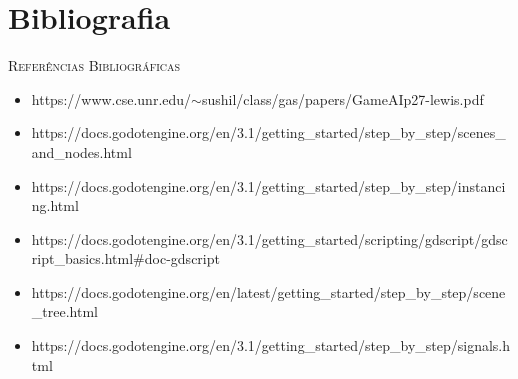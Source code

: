 
\chapter{Bibliografia}
\label{cap:Bibliografia}

\textsc{Referências Bibliográficas} 

\begin{itemize}
    \item[]
        https://www.cse.unr.edu/$\sim$sushil/class/gas/papers/GameAIp27-lewis.pdf
    \item[]
        https://docs.godotengine.org/en/3.1/getting\_started/step\_by\_step/scenes\_and\_nodes.html
    \item[]
        https://docs.godotengine.org/en/3.1/getting\_started/step\_by\_step/instancing.html
    \item[]
        https://docs.godotengine.org/en/3.1/getting\_started/scripting/gdscript/gdscript\_basics.html\#doc-gdscript
    \item[]
        https://docs.godotengine.org/en/latest/getting\_started/step\_by\_step/scene\_tree.html
    \item[]
        https://docs.godotengine.org/en/3.1/getting\_started/step\_by\_step/signals.html
\end{itemize}